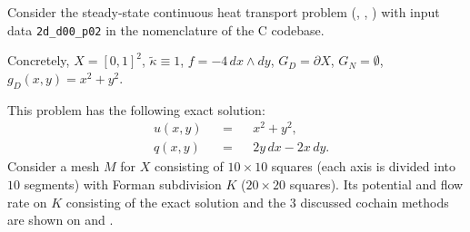 \begin{example}
  \label{cmc/diffusion/continuous/steady_state/examples/2d_d00_p02-example}
  Consider the steady-state continuous heat transport problem
  (,
   ,
   )
  with input data \verb|2d_d00_p02| in the nomenclature of the C codebase.

  Concretely,
    $X = [0, 1]^2$,
    $\tilde{\kappa} \equiv 1$,
    $f = -4 \, d x \wedge d y$,
    $G_D = \partial X$,
    $G_N = \emptyset$,
    $g_D(x, y) = x^2 + y^2$.

  This problem has the following exact solution:
  \begin{subequations}
    \begin{alignat}{3}
      & u(x, y) && = && x^2 + y^2, \\
      & q(x, y) && = && 2 y\, d x - 2 x\, d y.
    \end{alignat}
  \end{subequations}
  Consider a mesh $M$ for $X$ consisting of $10 \times 10$ squares (each axis is
  divided into $10$ segments) with Forman subdivision $K$ ($20 \times 20$
  squares).
  Its potential and flow rate on $K$ consisting of the exact solution and the
  $3$ discussed cochain methods are shown on
  and
  .
\end{example}
